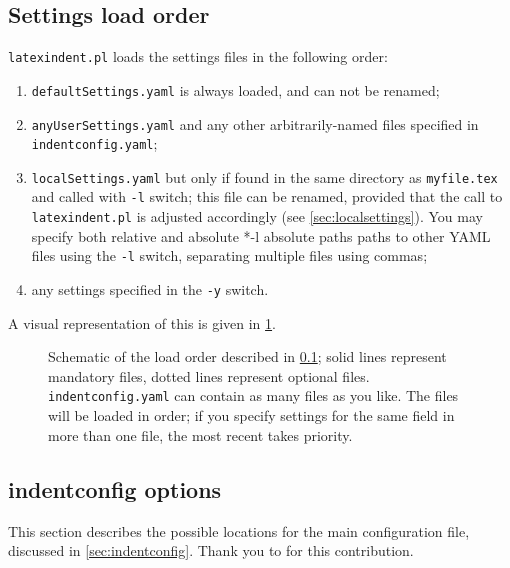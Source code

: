  \subsection{Settings load order}\label{sec:loadorder}
  \texttt{latexindent.pl} loads the settings files in the following order:
  \begin{enumerate}
   \item \texttt{defaultSettings.yaml} is always loaded, and can not be renamed;
   \item \texttt{anyUserSettings.yaml} and any other arbitrarily-named files specified in
         \texttt{indentconfig.yaml};
   \item \texttt{localSettings.yaml} but only if found in the same directory as
         \texttt{myfile.tex}
         and called with \texttt{-l} switch; this file can be renamed, provided that the call to
         \texttt{latexindent.pl} is adjusted accordingly (see \cref{sec:localsettings}). You may
         specify both relative and absolute%
         *{-l absolute paths} paths to other YAML files using the \texttt{-l}
         switch, separating multiple files using commas;
   \item any settings  specified in the
         \texttt{-y} switch.%
  \end{enumerate}
  A visual representation of this is given in \cref{fig:loadorder}.

  \begin{figure}[!htb]
   \centering
   
   \caption{Schematic of the load order described in \cref{sec:loadorder}; solid lines represent
   mandatory files, dotted lines represent optional files. \texttt{indentconfig.yaml} can
   contain as many files as you like. The files will be loaded in order; if you specify
   settings for the same field in more than one file, the most recent takes priority. }
   \label{fig:loadorder}
  \end{figure}

 \subsection{indentconfig options}
  This section describes the possible locations for the main configuration file,
  discussed in \cref{sec:indentconfig}. Thank you to \cite{nehctargl} for this
  contribution. 


